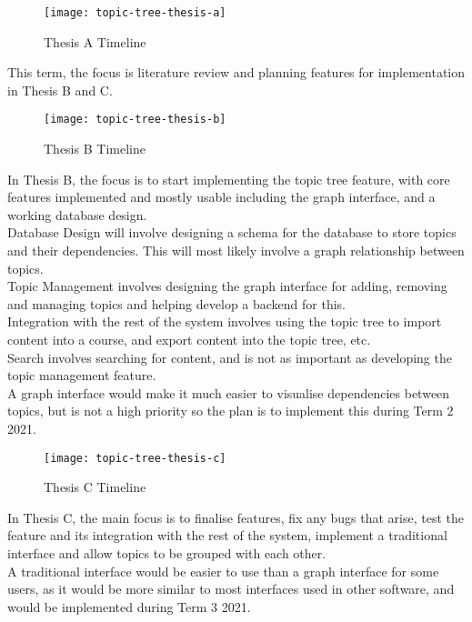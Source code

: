 \newpage

\begin{figure}[h!]
    \centering
    \texttt{[image: topic-tree-thesis-a]}
    \caption{Thesis A Timeline}
\end{figure}

This term, the focus is literature review and planning features for implementation in Thesis B and C.


\begin{figure}[h!]
    \centering
    \texttt{[image: topic-tree-thesis-b]}
    \caption{Thesis B Timeline}
\end{figure}

In Thesis B, the focus is to start implementing the topic tree feature, with core features implemented and mostly usable including the graph interface, and a working database design. \\

Database Design will involve designing a schema for the database to store topics and their dependencies. This will most likely involve a graph relationship between topics.\\
Topic Management involves designing the graph interface for adding, removing and managing topics and helping develop a backend for this.\\
Integration with the rest of the system involves using the topic tree to import content into a course, and export content into the topic tree, etc.\\
Search involves searching for content, and is not as important as developing the topic management feature.\\
A graph interface would make it much easier to visualise dependencies between topics, but is not a high priority so the plan is to implement this during Term 2 2021.\\

\begin{figure}[h!]
    \centering
    \texttt{[image: topic-tree-thesis-c]}
    \caption{Thesis C Timeline}
\end{figure}

In Thesis C, the main focus is to finalise features, fix any bugs that arise, test the feature and its integration with the rest of the system, implement a traditional interface and allow topics to be grouped with each other.\\

A traditional interface would be easier to use than a graph interface for some users, as it would be more similar to most interfaces used in other software, and would be implemented during Term 3 2021.\\

